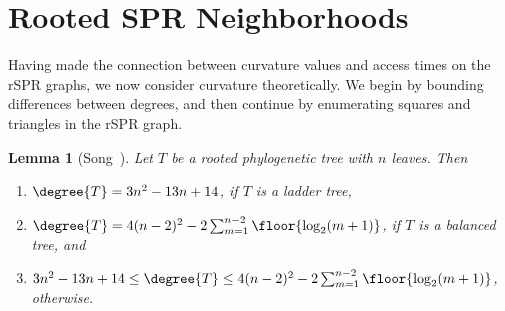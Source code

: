\documentclass[11pt,onecolumn,conference]{IEEEtran}
\newtheorem{lemma}[theorem]{Lemma}
\newcommand{\cuttable}[2][]{%
    \ifthenelse{\equal{#1}{}}%
		{}%
		{#1}%
}
\begin{document}
\section{Rooted SPR Neighborhoods}
\label{sec:neighborhoods}
Having made the connection between curvature values and access times on the rSPR graphs, we now consider curvature theoretically.
We begin by bounding differences between degrees, and then continue by enumerating squares and triangles in the rSPR graph.

\begin{lemma}[{Song~\cite{Song2003-gf}}]
\cuttable{    \pushQED{\qed}}
	\label{lem:degree_extremes}
	Let $T$ be a rooted phylogenetic tree with $n$ leaves. Then
	\begin{enumerate}
		\item $\degree{T} = 3n^2 - 13n + 14$, if $T$ is a ladder tree,
		\item $\degree{T} = 4(n-2)^2 - 2 \sum_{m=1}^{n-2} \floor{\log_2(m+1)}$, if $T$ is a balanced tree, and
		\item  $3n^2 - 13n + 14 \le \degree{T} \le 4(n-2)^2 - 2 \sum_{m=1}^{n-2} \floor{\log_2(m+1)}$, otherwise.
	\end{enumerate}
\cuttable{    \popQED}
\end{lemma}
\end{document}
